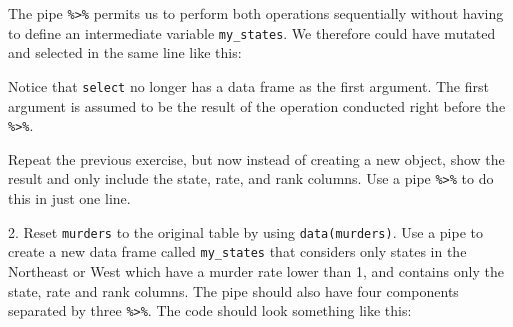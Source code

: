 \documentclass[
]{krantz}
\newenvironment{Shaded}{\begin{snugshade}}{\end{snugshade}}
\newcommand{\DataTypeTok}[1]{\textcolor[rgb]{0.27,0.27,0.27}{#1}}
\newcommand{\DecValTok}[1]{\textcolor[rgb]{0.06,0.06,0.06}{#1}}
\newcommand{\KeywordTok}[1]{\textcolor[rgb]{0.27,0.27,0.27}{\textbf{#1}}}
\newcommand{\NormalTok}[1]{#1}
\newcommand{\OperatorTok}[1]{\textcolor[rgb]{0.43,0.43,0.43}{\textbf{#1}}}
\newcommand{\StringTok}[1]{\textcolor[rgb]{0.5,0.5,0.5}{#1}}
\begin{document}
The pipe \texttt{\%\textgreater{}\%} permits us to perform both operations sequentially without having to define an intermediate variable \texttt{my\_states}. We therefore could have mutated and selected in the same line like this:

\begin{Shaded}
\end{Shaded}

Notice that \texttt{select} no longer has a data frame as the first argument. The first argument is assumed to be the result of the operation conducted right before the \texttt{\%\textgreater{}\%}.

Repeat the previous exercise, but now instead of creating a new object, show the result and only include the state, rate, and rank columns. Use a pipe \texttt{\%\textgreater{}\%} to do this in just one line.

\begin{Shaded}
\end{Shaded}

2. Reset \texttt{murders} to the original table by using \texttt{data(murders)}. Use a pipe to create a new data frame called \texttt{my\_states} that considers only states in the Northeast or West which have a murder rate lower than 1, and contains only the state, rate and rank columns. The pipe should also have four components separated by three \texttt{\%\textgreater{}\%}. The code should look something like this:
\end{document}
